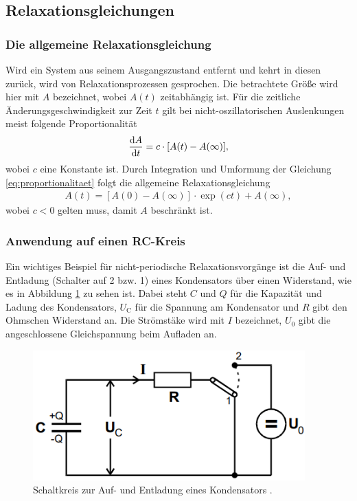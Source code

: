 \subsection{Relaxationsgleichungen}
\subsubsection{Die allgemeine Relaxationsgleichung}
%
Wird ein System aus seinem Ausgangszustand entfernt und kehrt in diesen zurück, wird von Relaxationsprozessen gesprochen.
Die betrachtete Größe wird hier mit $A$ bezeichnet, wobei $A(t)$ zeitabhängig ist.
Für die zeitliche Änderungsgeschwindigkeit zur Zeit $t$ gilt bei nicht-oszillatorischen Auslenkungen meist folgende Proportionalität
\begin{align}
    \label{eq:proportionalitaet}
    \frac{\mathop{}\!\mathrm{d}{A}}{\mathop{}\!\mathrm{d}{t}} = c \cdot [A(t) - A(\infty)],
\end{align}
wobei $c$ eine Konstante ist.
Durch Integration und Umformung der Gleichung \eqref{eq:proportionalitaet} folgt die allgemeine Relaxationsgleichung
\begin{align}
    \label{eq:allg_relaxationsglg}
    A(t) = [A(0) - A(\infty)] \cdot \exp{(ct)} + A(\infty),
\end{align}
wobei $c < 0$ gelten muss, damit $A$ beschränkt ist.

\subsubsection{Anwendung auf einen RC-Kreis}
Ein wichtiges Beispiel für nicht-periodische Relaxationsvorgänge ist die Auf- und Entladung (Schalter auf 2 bzw. 1) eines Kondensators über einen Widerstand, 
wie es in Abbildung \ref{fig:auf_und_entladung} zu sehen ist.
Dabei steht $C$ und $Q$ für die Kapazität und Ladung des Kondensators, $U_\text{C}$ für die Spannung am Kondensator und $R$ gibt den Ohmschen Widerstand an.
Die Strömstäke wird mit $I$ bezeichnet, $U_0$ gibt die angeschlossene Gleichspannung beim Aufladen an.
\begin{figure}[H]
    \centering
    \includegraphics[height = 5cm]{./abbildungen/auf und entladung.png}
    \caption{Schaltkreis zur Auf- und Entladung eines Kondensators \cite{man:v353}.}
    \label{fig:auf_und_entladung}
\end{figure}

